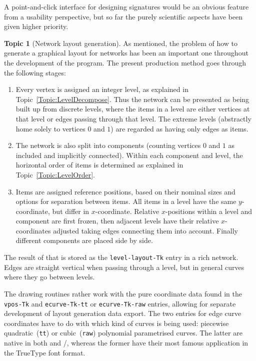 \documentclass{article}
\theoremstyle{definition}
\newtheorem{topic}{Topic}
\begin{document}
A point-and-click interface for designing signatures would be an 
obvious feature from a usability perspective, but so far the purely 
scientific aspects have been given higher priority.

\begin{topic}[Network layout generation] \label{Topic:Layout}
  As mentioned, the problem of how to generate a graphical layout for 
  networks has been an important one throughout the development of 
  the program. The present production method goes through the 
  following stages:
  \begin{enumerate}
    \item
      Every vertex is assigned an integer level, as explained in 
      Topic~\ref{Topic:LevelDecompose}. Thus the network can be 
      presented as being built up from discrete levels, where the 
      items in a level are either vertices at that level or edges 
      passing through that level. The extreme levels (abstractly home 
      solely to vertices $0$ and $1$) are regarded as having only 
      edges as items.
    \item
      The network is also split into components (counting vertices 
      $0$ and $1$ as included and implicitly connected). Within each 
      component and level, the horizontal order of items is 
      determined as explained in Topic~\ref{Topic:LevelOrder}.
    \item
      Items are assigned reference positions, based on their nominal 
      sizes and options for separation between items. All 
      items in a level have the same $y$-coordinate, but differ in 
      $x$-coordinate. Relative $x$-positions within a level and 
      component are first frozen, then adjacent levels have their 
      relative $x$-coordinates adjusted taking edges connecting them 
      into account. Finally different components are placed side by 
      side.
  \end{enumerate}
  The result of that is stored as the \verb|level-layout-Tk| entry in 
  a rich network. Edges are straight vertical when passing through a 
  level, but in general curves where they go between levels.
  
  The drawing routines rather work with the pure coordinate data 
  found in the \verb|vpos-Tk| and \verb|ecurve-Tk-tt| or 
  \verb|ecurve-Tk-raw| entries, allowing for separate development of 
  layout generation data export. The two entries for edge curve 
  coordinates have to do with which kind of curves is being used: 
  piecewise quadratic~(\texttt{tt}) or cubic~(\texttt{raw}) 
  polynomial parametrised curves. The latter are native in both 
   and \slash {}, whereas the 
  former have their most famous application in the TrueType font 
  format.
\end{topic}
\end{document}
